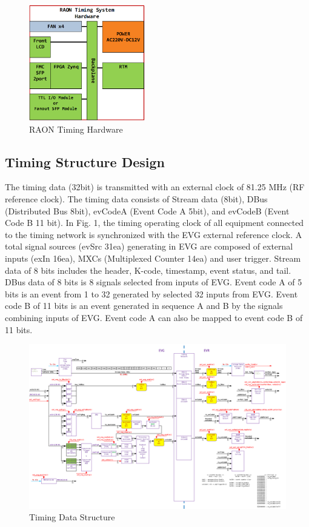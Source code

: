 \documentclass[journal,reqno]{IEEEtran}
\begin{document}
\begin{figure}[!htb]
	\centering
	\includegraphics*[width=0.45\textwidth, height=0.3\textwidth]{img03.png}
	\caption{RAON Timing Hardware}
	\label{timng_hardware}
\end{figure}


\subsection{Timing Structure Design}
The timing data (32bit) is transmitted with an external clock of 81.25 MHz (RF reference clock). The timing data consists of Stream data (8bit), DBus (Distributed Bus 8bit), evCodeA (Event Code A 5bit), and evCodeB (Event Code B 11 bit). In Fig. 1, the timing operating clock of all equipment connected to the timing network is synchronized with the EVG external reference clock. A total signal sources (evSrc 31ea) generating in EVG are composed of external inputs (exIn 16ea), MXCs (Multiplexed Counter 14ea) and user trigger. Stream data of 8 bits includes the header, K-code, timestamp, event status, and tail. DBus data of 8 bits is 8 signals selected from inputs of EVG. Event code A of 5 bits is an event from 1 to 32 generated by selected 32 inputs from EVG. Event code B of 11 bits is an event generated in sequence A and B by the signals combining inputs of EVG. Event code A can also be mapped to event code B of 11 bits.

\begin{figure}[!htb]
	\centering
	\includegraphics*[width=1\textwidth, height=0.5\textwidth]{img1-1.png}
	\caption{Timing Data Structure}
	\label{timing_data_structure}
\end{figure}
\end{document}
